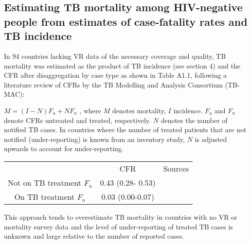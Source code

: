 \subsection{Estimating TB mortality among HIV-negative people from estimates of case-fatality rates and TB incidence
}

In 94 countries lacking VR data of the necessary coverage and quality, TB mortality was estimated as the product of TB incidence (see section 4) and the CFR after disaggregation by case type as shown in Table A1.1, following a literature review of CFRs by the TB Modelling and Analysis Consortium (TB-MAC):

$M = (I-N)F_u + NF_n$ , where $M$ denotes mortality, $I$ incidence. $F_u$ and $F_n$ denote CFRs untreated and treated, respectively. $N$ denotes the number of notified TB cases. In countries where the number of treated patients that are not notified (under-reporting) is known from an inventory study, $N$ is adjusted upwards to account for under-reporting. 

\begin{table} 
    \begin{tabular}{ c c c }
         & CFR & Sources \\ 
        Not on TB treatment $F_u$ & 0.43 (0.28- 0.53) &  \cite{12742798} \cite{21483732} \\ 
        On TB treatment $F_n$ & 0.03 (0.00-0.07) &  \cite{21738585} \\ 
    \end{tabular} 
\end{table}

This approach tends to overestimate TB mortality in countries with no VR or mortality survey data and the level of under-reporting of treated TB cases is unknown and large relative to the number of reported cases. 


